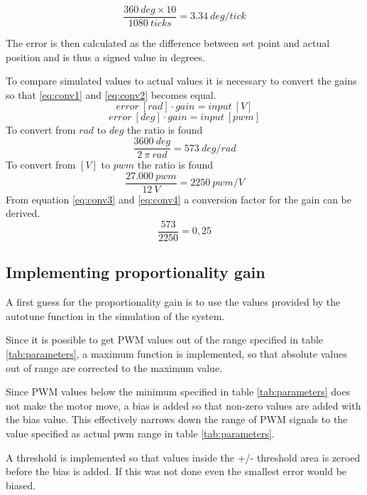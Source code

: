 \begin{equation}
\frac{360 \ deg \times 10}{1080 \ ticks} = 3.34\ deg/tick 
\end{equation}

The error is then calculated as the difference between set point and actual position and is thus a signed value in degrees.

To compare simulated values to actual values it is necessary to convert the gains so that \ref{eq:conv1} and \ref{eq:conv2} becomes equal. 
\begin{equation}
error \ [rad] \cdot gain = input \ [V]
\label{eq:conv1}
\end{equation}
\begin{equation}
error \ [deg] \cdot gain = input \ [pwm]
\label{eq:conv2}
\end{equation}
To convert from $rad$ to $deg$ the ratio is found
\begin{equation}
\frac{3600 \ deg}{2 \ \pi \ rad} = 573 \ deg/rad
\label{eq:conv3}
\end{equation}
To convert from $[V]$ to $pwm$ the ratio is found
\begin{equation}
\frac{27.000 \ pwm}{12 \ V} = 2250 \ pwm/V
\label{eq:conv4}
\end{equation}
From equation \ref{eq:conv3} and \ref{eq:conv4} a conversion factor for the gain can be derived.
\begin{equation}
\frac{573}{2250} = 0,25
\label{eq:conv}
\end{equation}

\subsection{Implementing proportionality gain}
A first guess for the proportionality gain is to use the values provided by the autotune function in the simulation of the system. 

Since it is possible to get PWM values out of the range specified in table \ref{tab:parameters}, a maximum function is implemented, so that absolute values out of range are corrected to the maximum value.

Since PWM values below the minimum specified in table \ref{tab:parameters} does not make the motor move, a bias is added so that non-zero values are added with the bias value. This effectively narrows down the range of PWM signals to the value specified as actual pwm range in table \ref{tab:parameters}. 

A threshold is implemented so that values inside the +/- threshold area is zeroed before the bias is added. If this was not done even the smallest error would be biased.

